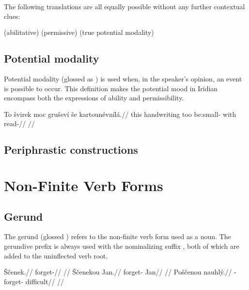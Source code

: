 The following translations are all equally possible without any further contextual clues:

\pex
\a {} (abilitative)
\a {} (permissive)
\a {} (true potential modality)
\xe

\subsection{Potential modality}

Potential modality (glossed as ) is used when, in the speaker's opinion, an event is possible to occur. This definition makes the potential mood in Iridian encompass both the expressions of ability and permissibility.

\pex
\begingl
\gla To \v{s}virek moc gru\v{s}ev\'i \v{s}e kartoun\'evn\'il\'a.//
\glb this handwriting too be:small- with read-//
\glft {}//
\endgl
\xe

\subsection{Periphrastic constructions}


\section{Non-Finite Verb Forms}

\subsection{Gerund}
\par The gerund (glossed ) refers to the non-finite verb form used as a noun. The gerundive prefix  is always used with the nominalizing suffix , both of which are added to the uninflected verb root.

\pex
\a
\begingl
\gla \v{S}\v{c}enek.//
\glb forget-//
\glft {}//
\endgl
\a
\begingl
\gla \v{S}\v{c}enekou Jan.//
\glb forget- Jan//
\glft {}//
\endgl
\a
\begingl
\gla Po\v{s}\v{c}enou nauhl\'y.//
\glb {}-forget- difficult//
\glft {}//
\endgl
\xe

